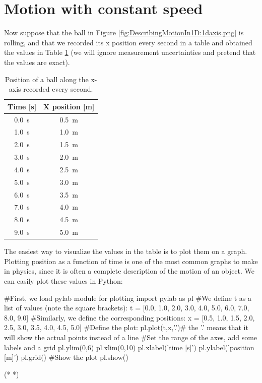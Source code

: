\section{Motion with constant speed}
Now suppose that the ball in Figure \ref{fig:DescribingMotionIn1D:1daxis.png} is rolling, and that we recorded its x position every second in a table and obtained the values in Table \ref{tab:DescribingMotionIn1D:1dmotion} (we will ignore measurement uncertainties and pretend that the values are exact).
\begin{table}[!h]
\centering
\begingroup
\renewcommand{\arraystretch}{1.0}
\begin{tabular}{cc}
\textbf{Time [s]}&\textbf{X position [m]}\\
\hline
\hline
\SI{0.0}{s}& \SI{0.5}{m}\\ \hline
\SI{1.0}{s}& \SI{1.0}{m}\\ \hline
\SI{2.0}{s}& \SI{1.5}{m}\\ \hline
\SI{3.0}{s}& \SI{2.0}{m}\\ \hline
\SI{4.0}{s}& \SI{2.5}{m}\\ \hline
\SI{5.0}{s}& \SI{3.0}{m}\\ \hline
\SI{6.0}{s}& \SI{3.5}{m}\\ \hline
\SI{7.0}{s}& \SI{4.0}{m}\\ \hline
\SI{8.0}{s}& \SI{4.5}{m}\\ \hline
\SI{9.0}{s}& \SI{5.0}{m}\\ \hline
\end{tabular}
\caption{\label{tab:DescribingMotionIn1D:1dmotion} Position of a ball along the x-axis recorded every second.}
\endgroup
\end{table}
The easiest way to visualize the values in the table is to plot them on a graph. Plotting position as a function of time is one of the most common graphs to make in physics, since it is often a complete description of the motion of an object. We can easily plot these values in Python:
\begin{python}[caption=Plotting position versus time] 
#First, we load pylab module for plotting
import pylab as pl
#We define t as a list of values (note the square brackets):
t = [0.0, 1.0, 2.0, 3.0, 4.0, 5.0, 6.0, 7.0, 8.0, 9.0]
#Similarly, we define the corresponding positions:
x = [0.5, 1.0, 1.5, 2.0, 2.5, 3.0, 3.5, 4.0, 4.5, 5.0]
#Define the plot:
pl.plot(t,x,'.')# the '.' means that it will show the actual points instead of a line
#Set the range of the axes, add some labels and a grid
pl.ylim(0,6)
pl.xlim(0,10)
pl.xlabel('time [s]')
pl.ylabel('position [m]')
pl.grid()
#Show the plot
pl.show()
\end{python}
\begin{poutput}
(*  *)
\end{poutput}

